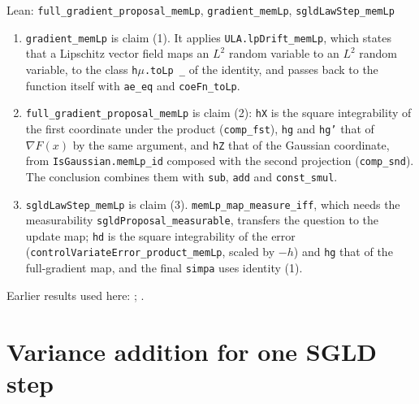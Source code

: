 \documentclass[11pt,a4paper]{article}
\begin{document}
\begin{leanbox}{Lean: \texttt{full\_\allowbreak{}gradient\_\allowbreak{}proposal\_\allowbreak{}memLp}, \texttt{gradient\_\allowbreak{}memLp}, \texttt{sgldLawStep\_\allowbreak{}memLp}}
\begin{enumerate}


\item \texttt{gradient\_\allowbreak{}mem\allowbreak{}Lp} is claim (1). It applies \texttt{ULA.\allowbreak{}lp\allowbreak{}Drift\_\allowbreak{}mem\allowbreak{}Lp}, which states that a Lipschitz vector field maps an \(L^2\) random variable to an \(L^2\) random variable, to the class \texttt{h\ensuremath{\mu}.\allowbreak{}to\allowbreak{}Lp \_\allowbreak{}} of the identity, and passes back to the function itself with \texttt{ae\_\allowbreak{}eq} and \texttt{coe\allowbreak{}Fn\_\allowbreak{}to\allowbreak{}Lp}.

\item \texttt{full\_\allowbreak{}gradient\_\allowbreak{}proposal\_\allowbreak{}mem\allowbreak{}Lp} is claim (2): \texttt{h\allowbreak{}X} is the square integrability of the first coordinate under the product (\texttt{comp\_\allowbreak{}fst}), \texttt{hg} and \texttt{hg'} that of \(\nabla F(x)\) by the same argument, and \texttt{h\allowbreak{}Z} that of the Gaussian coordinate, from \texttt{Is\allowbreak{}Gaussian.\allowbreak{}mem\allowbreak{}Lp\_\allowbreak{}id} composed with the second projection (\texttt{comp\_\allowbreak{}snd}). The conclusion combines them with \texttt{sub}, \texttt{add} and \texttt{const\_\allowbreak{}smul}.

\item \texttt{sgld\allowbreak{}Law\allowbreak{}Step\_\allowbreak{}mem\allowbreak{}Lp} is claim (3). \texttt{mem\allowbreak{}Lp\_\allowbreak{}map\_\allowbreak{}measure\_\allowbreak{}iff}, which needs the measurability \texttt{sgld\allowbreak{}Proposal\_\allowbreak{}measurable}, transfers the question to the update map; \texttt{hd} is the square integrability of the error (\texttt{control\allowbreak{}Variate\allowbreak{}Error\_\allowbreak{}product\_\allowbreak{}mem\allowbreak{}Lp}, scaled by \(-h\)) and \texttt{hg} that of the full-gradient map, and the final \texttt{simpa} uses identity (1).

\end{enumerate}
\end{leanbox}


Earlier results used here: \cite[Section~3.13.4]{LangevinLean2026ULASC}; \cite[Section~3.34.1]{LangevinLean2026ULASC}.

\section{\texorpdfstring{Variance addition for one SGLD step}{Variance addition for one SGLD step}}
\end{document}
